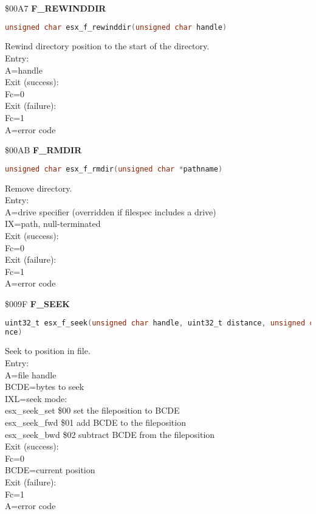 \$00A7 \textbf{F\_REWINDDIR}

\begin{lstlisting}[language=C]
unsigned char esx_f_rewinddir(unsigned char handle)
\end{lstlisting}

Rewind directory position to the start of the directory.\\
Entry:\\
A=handle\\
Exit (success):\\
Fc=0\\
Exit (failure):\\
Fc=1\\
A=error code

\$00AB \textbf{F\_RMDIR}

\begin{lstlisting}[language=C]
unsigned char esx_f_rmdir(unsigned char *pathname)
\end{lstlisting}

Remove directory.\\
Entry:\\
A=drive specifier (overridden if filespec includes a drive)\\
IX=path, null-terminated\\
Exit (success):\\
Fc=0\\
Exit (failure):\\
Fc=1\\
A=error code

\$009F \textbf{F\_SEEK}

\begin{lstlisting}[language=C]
uint32_t esx_f_seek(unsigned char handle, uint32_t distance, unsigned char whe
nce)
\end{lstlisting}

Seek to position in file.\\
Entry:\\
A=file handle\\
BCDE=bytes to seek\\
IXL=seek mode:\\
esx\_seek\_set \$00 set the fileposition to BCDE\\
esx\_seek\_fwd \$01 add BCDE to the fileposition\\
esx\_seek\_bwd \$02 subtract BCDE from the fileposition\\
Exit (success):\\
Fc=0\\
BCDE=current position\\
Exit (failure):\\
Fc=1\\
A=error code

